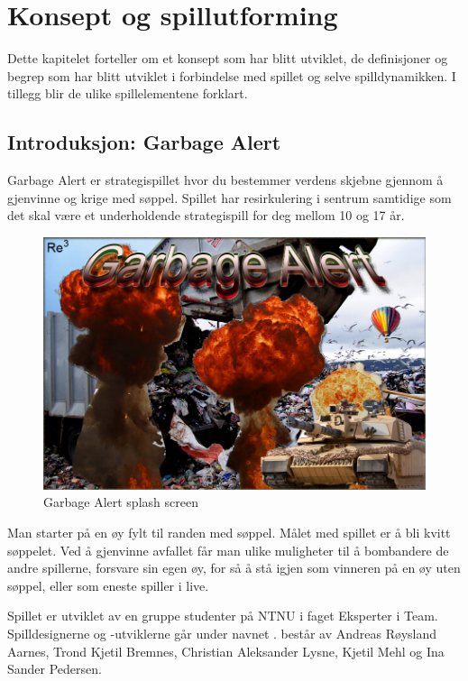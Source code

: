 \section{Konsept og spillutforming}\label{sec:konsept}
Dette kapitelet forteller om et konsept som har blitt utviklet, de definisjoner
og begrep som har blitt utviklet i forbindelse med spillet og selve
spilldynamikken. I tillegg blir de ulike spillelementene forklart.

\subsection{Introduksjon: Garbage Alert}
Garbage Alert er strategispillet hvor du bestemmer verdens skjebne gjennom å
gjenvinne og krige med søppel. Spillet har resirkulering i sentrum
samtidige som det skal være et underholdende strategispill for deg
mellom 10 og 17 år.

	\begin{figure} [here]
		\begin{center}
		\includegraphics[scale=0.5]{images/splashscreen}
		\end{center}
		\caption{Garbage Alert splash screen}
	\end{figure}


Man starter på en øy fylt til randen med søppel. Målet med spillet er å bli
kvitt søppelet. Ved å gjenvinne avfallet får man ulike muligheter til å
bombandere de andre spillerne, forsvare sin egen øy, for så å stå igjen
som vinneren på en øy uten søppel, eller som eneste spiller i live.

Spillet er utviklet av en gruppe studenter på NTNU i faget Eksperter i Team. Spilldesignerne og -utviklerne går under navnet .  består av Andreas Røysland Aarnes, Trond Kjetil Bremnes, Christian Aleksander Lysne, Kjetil Mehl og Ina Sander Pedersen.

